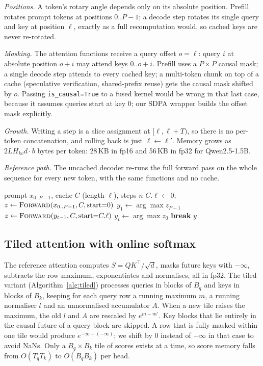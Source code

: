 \documentclass[conference]{IEEEtran}
\begin{document}
\emph{Positions.} A token's rotary angle depends only on its absolute position. Prefill rotates prompt tokens at positions $0..P{-}1$; a decode step rotates its single query and key at position $\ell$, exactly as a full recomputation would, so cached keys are never re-rotated.

\emph{Masking.} The attention functions receive a query offset $o=\ell$: query $i$ at absolute position $o+i$ may attend keys $0..o+i$. Prefill uses a $P\times P$ causal mask; a single decode step attends to every cached key; a multi-token chunk on top of a cache (speculative verification, shared-prefix reuse) gets the causal mask shifted by $o$. Passing \texttt{is\_causal=True} to a fused kernel would be wrong in that last case, because it assumes queries start at key 0; our SDPA wrapper builds the offset mask explicitly.

\emph{Growth.} Writing a step is a slice assignment at $[\ell, \ell{+}T)$, so there is no per-token concatenation, and rolling back is just $\ell\leftarrow\ell'$. Memory grows as $2LH_{kv}d\cdot b$ bytes per token: 28\,KB in fp16 and 56\,KB in fp32 for Qwen2.5-1.5B.

\emph{Reference path.} The uncached decoder re-runs the full forward pass on the whole sequence for every new token, with the same functions and no cache.

\begin{algorithm}[t]
\caption{Greedy decoding with an explicit KV cache}
\label{alg:kv}
\begin{algorithmic}[1]
\Require prompt $x_{0..P-1}$, cache $C$ (length $\ell$), steps $n$
\State $C.\ell \gets 0$;\quad $z \gets \Call{Forward}{x_{0..P-1}, C, \text{start}{=}0}$ 
\State $y_1 \gets \arg\max z_{P-1}$
  \State $z \gets \Call{Forward}{y_{t-1}, C, \text{start}{=}C.\ell}$ 
  \State $y_t \gets \arg\max z_0$ 
   \textbf{break} \EndIf
\EndFor
\State \Return $y$
\end{algorithmic}
\end{algorithm}

\subsection{Tiled attention with online softmax}
The reference attention computes $S=QK^\top/\sqrt{d}$, masks future keys with $-\infty$, subtracts the row maximum, exponentiates and normalises, all in fp32. The tiled variant (Algorithm~\ref{alg:tiled}) processes queries in blocks of $B_q$ and keys in blocks of $B_k$, keeping for each query row a running maximum $m$, a running normaliser $l$ and an unnormalised accumulator $A$. When a new tile raises the maximum, the old $l$ and $A$ are rescaled by $e^{m-m'}$. Key blocks that lie entirely in the causal future of a query block are skipped. A row that is fully masked within one tile would produce $e^{-\infty-(-\infty)}$; we shift by 0 instead of $-\infty$ in that case to avoid NaNs. Only a $B_q\times B_k$ tile of scores exists at a time, so score memory falls from $O(T_qT_k)$ to $O(B_qB_k)$ per head.
\end{document}
